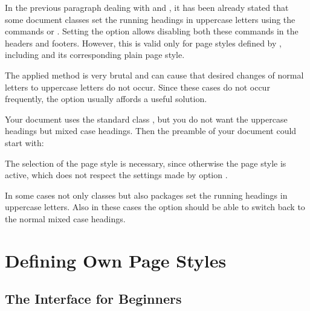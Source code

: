 \begin{Declaration}
\end{Declaration}%
%
In the previous paragraph dealing with  and
, it has been already stated that some document classes
set the running headings in uppercase letters using the
commands
or .
Setting the option  allows disabling both these commands
in the headers and footers.  However, this is valid only for page styles
defined by , including  and its
corresponding plain page style.

The applied method is very brutal and can cause that desired changes
of normal letters to uppercase letters  do
not occur.  Since these cases do not occur frequently, the option
 usually affords a useful solution.
\begin{Example}
  Your document uses the standard class ,
  but you do not want the uppercase headings but mixed case
  headings. Then the preamble of your document could start with:
  The selection of the page style  is necessary,
  since otherwise the page style  is active, which
  does not respect the settings made by option .
\end{Example}

In some cases not only classes but also packages set the running
headings in uppercase letters.
Also in these cases the option  should be able
to switch back to the normal mixed case headings.%
%


\section{Defining Own Page Styles}\label{sec:scrpage.UI}
%
% 
\subsection{The Interface for Beginners}\label{sec:scrpage.UI.user}
{}


